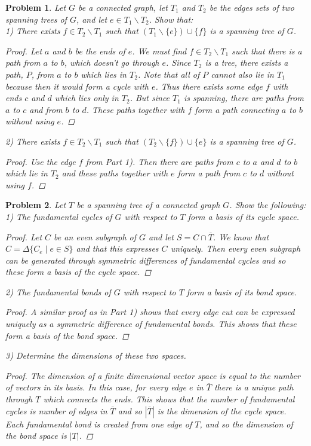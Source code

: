 \documentclass{article}
\newtheorem{problem}{Problem}
\begin{document}
\begin{flushleft}
\begin{problem}
Let $G$ be a connected graph, let $T_1$ and $T_2$ be the edges sets of two spanning trees of $G$, and let $e \in T_1 \backslash T_2$. Show that:\\
1) There exists $f \in T_2 \backslash T_1$ such that $(T_1 \backslash \{e\}) \cup \{f\}$ is a spanning tree of $G$.
\begin{proof}
Let $a$ and $b$ be the ends of $e$. We must find $f \in T_2 \backslash T_1$ such that there is a path from $a$ to $b$, which doesn't go through $e$. Since $T_2$ is a tree, there exists a path, $P$, from $a$ to $b$ which lies in $T_2$. Note that all of $P$ cannot also lie in $T_1$ because then it would form a cycle with $e$. Thus there exists some edge $f$ with ends $c$ and $d$ which lies only in $T_2$. But since $T_1$ is spanning, there are paths from $a$ to $c$ and from $b$ to $d$. These paths together with $f$ form a path connecting $a$ to $b$ without using $e$.
\end{proof}
2) There exists $f \in T_2 \backslash T_1$ such that $(T_2 \backslash \{f\}) \cup \{e\}$ is a spanning tree of $G$.
\begin{proof}
Use the edge $f$ from Part 1). Then there are paths from $c$ to $a$ and $d$ to $b$ which lie in $T_2$ and these paths together with $e$ form a path from $c$ to $d$ without using $f$.
\end{proof}
\end{problem}

\begin{problem}
Let $T$ be a spanning tree of a connected graph $G$. Show the following:\\
1) The fundamental cycles of $G$ with respect to $T$ form a basis of its cycle space.
\begin{proof}
Let $C$ be an even subgraph of $G$ and let $S = C \cap \overline{T}$. We know that $C = \Delta \{C_e \mid e \in S\}$ and that this expresses $C$ uniquely. Then every even subgraph can be generated through symmetric differences of fundamental cycles and so these form a basis of the cycle space.
\end{proof}
2) The fundamental bonds of $G$ with respect to $T$ form a basis of its bond space.
\begin{proof}
A similar proof as in Part 1) shows that every edge cut can be expressed uniquely as a symmetric difference of fundamental bonds. This shows that these form a basis of the bond space.
\end{proof}
3) Determine the dimensions of these two spaces.
\begin{proof}
The dimension of a finite dimensional vector space is equal to the number of vectors in its basis. In this case, for every edge $e$ in $\overline{T}$ there is a unique path through $T$ which connects the ends. This shows that the number of fundamental cycles is number of edges in $\overline{T}$ and so $|\overline{T}|$ is the dimension of the cycle space. Each fundamental bond is created from one edge of $T$, and so the dimension of the bond space is $|T|$.
\end{proof}
\end{problem}

\end{flushleft}
\end{document}
